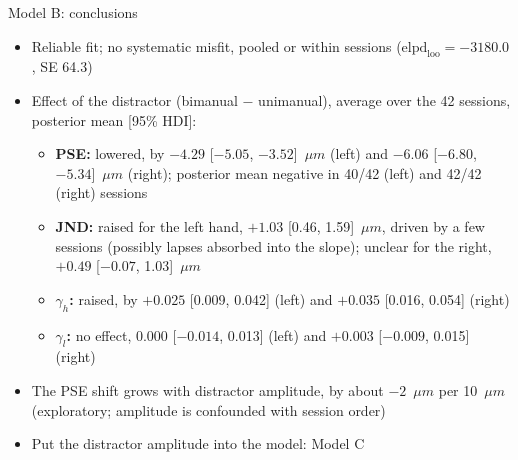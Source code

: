 \begin{frame}{Model B: conclusions}
  \small
  \begin{itemize}
    \item Reliable fit; no systematic misfit, pooled or within sessions
          ($\text{elpd}_\text{loo} = -3180.0$, SE 64.3)
    \item Effect of the distractor (bimanual $-$ unimanual), average over the 42 sessions,
          posterior mean [95\% HDI]:
    \begin{itemize}
      \item \textbf{PSE:} lowered, by $-4.29$ [$-5.05$, $-3.52$]~$\mu m$ (left) and
            $-6.06$ [$-6.80$, $-5.34$]~$\mu m$ (right); posterior mean negative in 40/42 (left) and
            42/42 (right) sessions
      \item \textbf{JND:} raised for the left hand, $+1.03$ [0.46, 1.59]~$\mu m$, driven by a
            few sessions (possibly lapses absorbed into the slope); unclear for the right, $+0.49$ [$-0.07$, 1.03]~$\mu m$
      \item \textbf{\boldmath$\gamma_h$:} raised, by $+0.025$ [0.009, 0.042] (left) and
            $+0.035$ [0.016, 0.054] (right)
      \item \textbf{\boldmath$\gamma_l$:} no effect, $0.000$ [$-0.014$, 0.013] (left) and
            $+0.003$ [$-0.009$, 0.015] (right)
    \end{itemize}
    \item The PSE shift grows with distractor amplitude, by about $-2$~$\mu m$ per 10~$\mu m$
          (exploratory; amplitude is confounded with session order)
    \item[$\Rightarrow$] Put the distractor amplitude into the model: Model C
  \end{itemize}
\end{frame}

